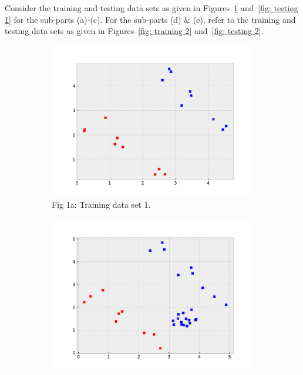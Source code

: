 \begin{enumerate}[font={\Large\bfseries},left=0pt]
\begin{Q}
              Consider the training and testing data sets as given in Figures~\ref{fig: training 1} and~\ref{fig: testing 1} for the sub-parts (a)-(c). For the sub-parts (d) \& (e), refer to the training and testing data sets as given in Figures~\ref{fig: training 2} and~\ref{fig: testing 2}.
              \begin{figure}[h]
                \centering
                \begin{subfigure}{0.49\columnwidth}
                \centering
                \includegraphics[width=0.99\columnwidth]{figures/training.pdf}
                \caption{Fig 1a: Training data set 1.}
                \label{fig: training 1}
                \end{subfigure}
                \begin{subfigure}{0.49\columnwidth}
                \centering
                \includegraphics[width=0.99\columnwidth]{figures/testing.pdf}

\end{subfigure}
\end{figure}
\end{Q}
\end{enumerate}
